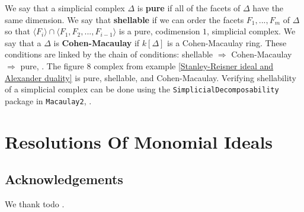 \documentclass[12pt,leqno]{amsart}
\theoremstyle{definition}
\begin{document}
%
We say that a simplicial complex $\Delta$ is \textbf{pure} if all of the facets of $\Delta$ have the same dimension. We say that \textbf{shellable} if we can order the facets $F_1,...,F_m$ of $\Delta$ so that $\langle F_i \rangle \cap \langle F_1,F_2,...,F_{i-1} \rangle$ is a pure, codimension $1$, simplicial complex. We say that a $\Delta$ is \textbf{Cohen-Macaulay} if $k[\Delta]$ is a Cohen-Macaulay ring. These conditions are linked by the chain of conditions: shellable $\Longrightarrow$ Cohen-Macaulay $\Longrightarrow$ pure, \cite[Corollary 5,1.5 \& Theorem 5.1.13]{BH}. The figure 8 complex from example \ref{Stanley-Reisner ideal and Alexander duality} is pure, shellable, and Cohen-Macaulay. Verifying shellability of a simplicial complex can be done using the \texttt{SimplicialDecomposability} package in \texttt{Macaulay2}, \cite{Cook}.






%
\section{Resolutions Of Monomial Ideals}



\subsection*{Acknowledgements}
We thank todo .
               
\end{document}
